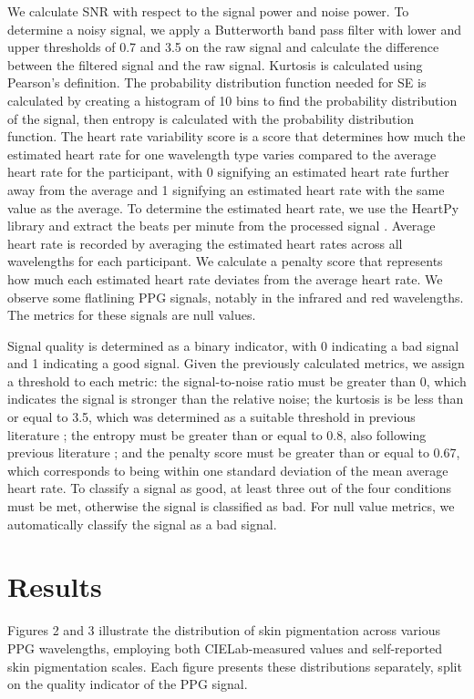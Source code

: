 \documentclass[letterpaper, 10 pt, conference]{ieeeconf}  %
\begin{document}
We calculate SNR with respect to the signal power and noise power. To determine a noisy signal, we apply a Butterworth band pass filter with lower and upper thresholds of 0.7 and 3.5 on the raw signal and calculate the difference between the filtered signal and the raw signal. Kurtosis is calculated using Pearson's definition. The probability distribution function needed for SE is calculated by creating a histogram of 10 bins to find the probability distribution of the signal, then entropy is calculated with the probability distribution function. The heart rate variability score is a score that determines how much the estimated heart rate for one wavelength type varies compared to the average heart rate for the participant, with 0 signifying an estimated heart rate further away from the average and 1 signifying an estimated heart rate with the same value as the average. To determine the estimated heart rate, we use the HeartPy library and extract the beats per minute from the processed signal \cite{gent_analysing_2018}. Average heart rate is recorded by averaging the estimated heart rates across all wavelengths for each participant. We calculate a penalty score that represents how much each estimated heart rate deviates from the average heart rate.
We observe some flatlining PPG signals, notably in the infrared and red wavelengths. The metrics for these signals are null values.

Signal quality is determined as a binary indicator, with 0 indicating a bad signal and 1 indicating a good signal. Given the previously calculated metrics, we assign a threshold to each metric: the signal-to-noise ratio must be greater than 0, which indicates the signal is stronger than the relative noise; the kurtosis is be less than or equal to 3.5, which was determined as a suitable threshold in previous literature \cite{selvaraj_statistical_2011}; the entropy must be greater than or equal to 0.8, also following previous literature \cite{selvaraj_statistical_2011}; and the penalty score must be greater than or equal to 0.67, which corresponds to being within one standard deviation of the mean average heart rate. To classify a signal as good, at least three out of the four conditions must be met, otherwise the signal is classified as bad. For null value metrics, we automatically classify the signal as a bad signal.

\section{Results}
Figures 2 and 3 illustrate the distribution of skin pigmentation across various PPG wavelengths, employing both CIELab-measured values and self-reported skin pigmentation scales. Each figure presents these distributions separately,  split on the quality indicator of the PPG signal.
\end{document}
